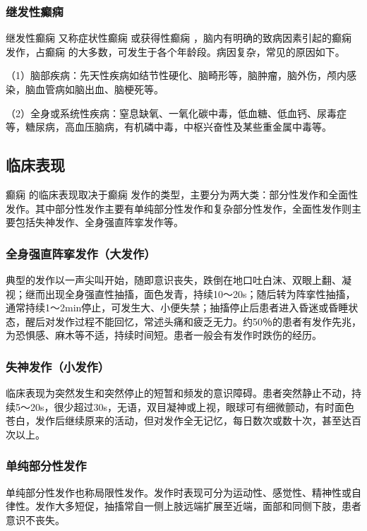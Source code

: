 \subsubsection{继发性癫痫}

继发性癫痫
又称症状性癫痫
或获得性癫痫
，脑内有明确的致病因素引起的癫痫
发作，占癫痫
的大多数，可发生于各个年龄段。病因复杂，常见的原因如下。

（1）脑部疾病：先天性疾病如结节性硬化、脑畸形等，脑肿瘤，脑外伤，颅内感染，脑血管病如脑出血、脑梗死等。

（2）全身或系统性疾病：窒息缺氧、一氧化碳中毒，低血糖、低血钙、尿毒症等，糖尿病，高血压脑病，有机磷中毒，中枢兴奋性及某些重金属中毒等。

\subsection{临床表现}

癫痫
的临床表现取决于癫痫
发作的类型，主要分为两大类：部分性发作和全面性发作。其中部分性发作主要有单纯部分性发作和复杂部分性发作，全面性发作则主要包括失神发作、全身强直阵挛发作等。

\subsubsection{全身强直阵挛发作（大发作）}

典型的发作以一声尖叫开始，随即意识丧失，跌倒在地口吐白沫、双眼上翻、凝视；继而出现全身强直性抽搐，面色发青，持续10～20s；随后转为阵挛性抽搐，通常持续1～2min停止，可发生大、小便失禁；抽搐停止后患者进入昏迷或昏睡状态，醒后对发作过程不能回忆，常述头痛和疲乏无力。约50％的患者有发作先兆，为恐惧感、麻木等不适，持续时间短。患者一般会有发作时跌伤的经历。

\subsubsection{失神发作（小发作）}

临床表现为突然发生和突然停止的短暂和频发的意识障碍。患者突然静止不动，持续5～20s，很少超过30s，无语，双目凝神或上视，眼球可有细微颤动，有时面色苍白，发作后继续原来的活动，但对发作全无记忆，每日数次或数十次，甚至达百次以上。

\subsubsection{单纯部分性发作}

单纯部分性发作也称局限性发作。发作时表现可分为运动性、感觉性、精神性或自律性。发作大多短促，抽搐常自一侧上肢远端扩展至近端，面部和同侧下肢，患者意识不丧失。

